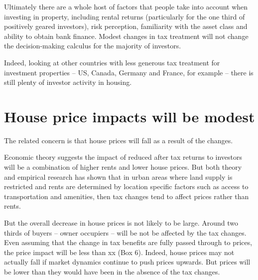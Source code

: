\documentclass{grattan}\usepackage[]{graphicx}\usepackage[]{color}
\begin{document}
Ultimately there are a whole host of factors that people take into account when investing in property, including rental returns (particularly for the one third of positively geared investors), risk perception, familiarity with the asset class and ability to obtain bank finance.  Modest changes in tax treatment will not change the decision-making calculus for the majority of investors. 

Indeed, looking at other countries with less generous tax treatment for investment properties -- US, Canada, Germany and France, for example -- there is still plenty of investor activity in housing.

\section{House price impacts will be modest}
The related concern is that house prices will fall as a result of the changes. 

Economic theory suggests the impact of reduced after tax returns to investors will be a combination of higher rents and lower house prices.  But both theory and empirical research has shown that in urban areas where land supply is restricted and rents are determined by location specific factors such as access to transportation and amenities, then tax changes tend to affect prices rather than rents.  

But the overall decrease in house prices is not likely to be large. Around two thirds of buyers -- owner occupiers -- will be not be affected by the tax changes. Even assuming that the change in tax benefits are fully passed through to prices, the price impact will be less than xx (Box 6). Indeed, house prices may not actually fall if market dynamics continue to push prices upwards. But prices will be lower than they would have been in the absence of the tax changes.
\end{document}
